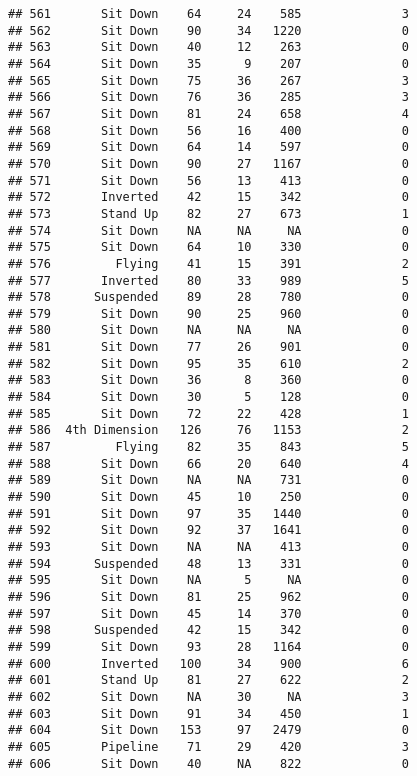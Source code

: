 \documentclass[
]{article}
\begin{document}
\begin{verbatim}
## 561       Sit Down    64     24    585              3
## 562       Sit Down    90     34   1220              0
## 563       Sit Down    40     12    263              0
## 564       Sit Down    35      9    207              0
## 565       Sit Down    75     36    267              3
## 566       Sit Down    76     36    285              3
## 567       Sit Down    81     24    658              4
## 568       Sit Down    56     16    400              0
## 569       Sit Down    64     14    597              0
## 570       Sit Down    90     27   1167              0
## 571       Sit Down    56     13    413              0
## 572       Inverted    42     15    342              0
## 573       Stand Up    82     27    673              1
## 574       Sit Down    NA     NA     NA              0
## 575       Sit Down    64     10    330              0
## 576         Flying    41     15    391              2
## 577       Inverted    80     33    989              5
## 578      Suspended    89     28    780              0
## 579       Sit Down    90     25    960              0
## 580       Sit Down    NA     NA     NA              0
## 581       Sit Down    77     26    901              0
## 582       Sit Down    95     35    610              2
## 583       Sit Down    36      8    360              0
## 584       Sit Down    30      5    128              0
## 585       Sit Down    72     22    428              1
## 586  4th Dimension   126     76   1153              2
## 587         Flying    82     35    843              5
## 588       Sit Down    66     20    640              4
## 589       Sit Down    NA     NA    731              0
## 590       Sit Down    45     10    250              0
## 591       Sit Down    97     35   1440              0
## 592       Sit Down    92     37   1641              0
## 593       Sit Down    NA     NA    413              0
## 594      Suspended    48     13    331              0
## 595       Sit Down    NA      5     NA              0
## 596       Sit Down    81     25    962              0
## 597       Sit Down    45     14    370              0
## 598      Suspended    42     15    342              0
## 599       Sit Down    93     28   1164              0
## 600       Inverted   100     34    900              6
## 601       Stand Up    81     27    622              2
## 602       Sit Down    NA     30     NA              3
## 603       Sit Down    91     34    450              1
## 604       Sit Down   153     97   2479              0
## 605       Pipeline    71     29    420              3
## 606       Sit Down    40     NA    822              0

\end{verbatim}
\end{document}
